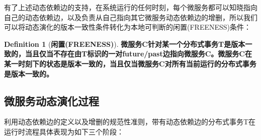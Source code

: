 \documentclass[12pt,a4paper]{article}
\theoremstyle{definition}
\newtheorem{definition}{Definition}[section]
\begin{document}
有了上述动态依赖边的支持，在系统运行的任何时刻，每个微服务都可以知晓指向自己的动态依赖边，以及负责从自己指向其它微服务动态依赖边的增删，所以我们可以将动态演化的版本一致性条件转化为本地可判断的闲置(FREENESS)条件：

\begin{definition}[\textbf{闲置(FREENESS)}]
\label{definition:freeness}
\textbf{微服务C针对某一个分布式事务T是版本一致的，当且仅当不存在由T标识的一对future/past边指向微服务C。微服务C在某一时刻下的状态是版本一致的，当且仅当微服务C对所有当前运行的分布式事务是版本一致的。}
\end{definition}


\subsection{微服务动态演化过程}
利用动态依赖边的定义以及增删的规范性准则，带有动态依赖边的分布式事务T在运行时流程具体表现为如下三个阶段：
\end{document}

